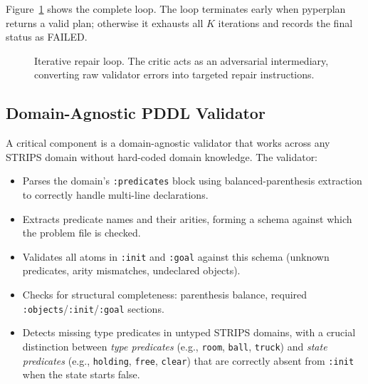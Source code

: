 \documentclass{article}
\begin{document}
Figure~\ref{fig:pipeline} shows the complete loop.  The loop terminates early when
pyperplan returns a valid plan; otherwise it exhausts all $K$ iterations and records
the final status as FAILED.

\begin{figure}[h]
\centering
{}
\caption{Iterative repair loop.  The critic acts as an adversarial intermediary,
         converting raw validator errors into targeted repair instructions.}
\label{fig:pipeline}
\end{figure}

\subsection{Domain-Agnostic PDDL Validator}
\label{sec:validator}

A critical component is a domain-agnostic validator that works across any STRIPS
domain without hard-coded domain knowledge.  The validator:

\begin{itemize}[leftmargin=1.5em]
  \item Parses the domain's \texttt{:predicates} block using balanced-parenthesis
        extraction to correctly handle multi-line declarations.
  \item Extracts predicate names and their arities, forming a schema against which the
        problem file is checked.
  \item Validates all atoms in \texttt{:init} and \texttt{:goal} against this schema
        (unknown predicates, arity mismatches, undeclared objects).
  \item Checks for structural completeness: parenthesis balance, required
        \texttt{:objects}/\texttt{:init}/\texttt{:goal} sections.
  \item Detects missing type predicates in untyped STRIPS domains, with a crucial
        distinction between \emph{type predicates} (e.g., \texttt{room}, \texttt{ball},
        \texttt{truck}) and \emph{state predicates} (e.g., \texttt{holding},
        \texttt{free}, \texttt{clear}) that are correctly absent from \texttt{:init}
        when the state starts false.
\end{itemize}
\end{document}
